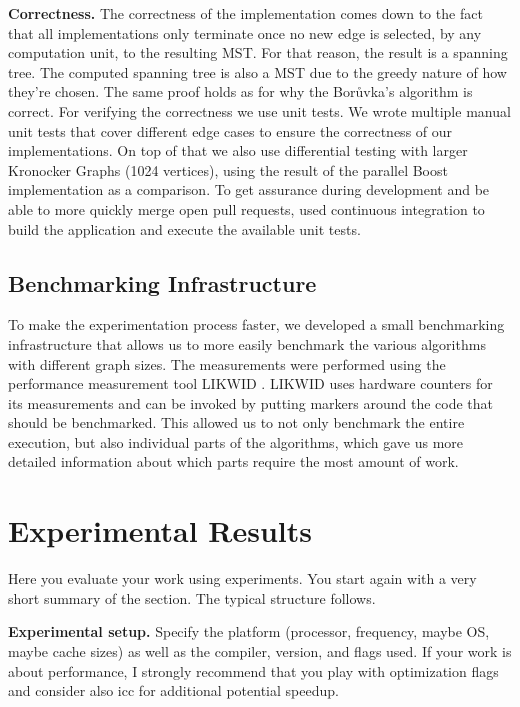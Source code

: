 \documentclass[letterpaper]{article}
\newcommand{\mypar}[1]{{\bf #1.}}
\begin{document}
\mypar{Correctness}
The correctness of the implementation comes down to the fact that all implementations only terminate once no new edge is
selected, by any computation unit, to the resulting MST. For that reason, the result is a spanning tree. The computed
spanning tree is also a MST due to the greedy nature of how they're chosen. The same proof holds as for why the
Bor\r{u}vka's algorithm is correct\cite{nevsetvril2012origins}. For verifying the correctness we use unit tests. We
wrote multiple manual unit tests that cover different edge cases to ensure the correctness of our implementations. On
top of that we also use differential testing with larger Kronocker Graphs (1024 vertices), using the result of the
parallel Boost implementation as a comparison. To get assurance during development and be able to more quickly merge
open pull requests, used continuous integration to build the application and execute the available unit tests.

\subsection{Benchmarking Infrastructure}
To make the experimentation process faster, we developed a small benchmarking infrastructure that allows us to more
easily benchmark the various algorithms with different graph sizes. The measurements were performed using the
performance measurement tool LIKWID \cite{treibig2010likwid}. LIKWID uses hardware counters for its measurements and can
be invoked by putting markers around the code that should be benchmarked. This allowed us to not only benchmark the
entire execution, but also individual parts of the algorithms, which gave us more detailed information about which parts
require the most amount of work.

\section{Experimental Results}\label{sec:exp}

Here you evaluate your work using experiments. You start again with a
very short summary of the section. The typical structure follows.

\mypar{Experimental setup} Specify the platform (processor, frequency, maybe OS, maybe cache sizes)
as well as the compiler, version, and flags used. If your work is about performance, 
I strongly recommend that you play with optimization flags and consider also icc for additional potential speedup.
\end{document}
